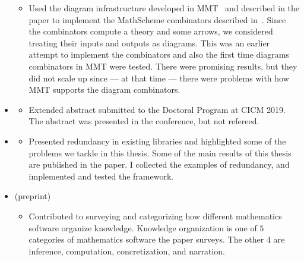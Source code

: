 \begin{itemize}
\begin{itemize}
    \item[] Used the diagram infrastructure developed in MMT~\cite{rabe2013scalable} and described in the paper to implement the MathScheme combinators described in~\cite{carette2018building}. Since the combinators compute a theory and some arrows, we considered treating their inputs and outputs as diagrams.
This was an earlier attempt to implement the combinators and also the first time diagrams combinators in MMT were tested.  There were promising results, but they did not scale up since --- at that time --- there were problems with how MMT supports the diagram combinators. 
    \end{itemize}        
    \item \cite{cicm2019docotral} 
    \begin{itemize}
    \item[] Extended abstract submitted to the Doctoral Program at CICM 2019. The abstract was presented in the conference, but not refereed. 
    \end{itemize}
    \item \cite{leverageCICM2020} 
    \begin{itemize}
    \item[]  Presented redundancy in existing libraries and highlighted some of the problems we tackle in this thesis. Some of the main results of this thesis are published in the paper. I collected the examples of redundancy, and implemented and tested the framework.
    \end{itemize} 
    \item \cite{bercic2020space} (preprint)
    \begin{itemize}
    \item[] Contributed to surveying and categorizing how different mathematics software organize knowledge. Knowledge organization is one of $5$ categories of mathematics software the paper surveys. The other $4$ are inference, computation, concretization, and narration. 
    \end{itemize}        
\end{itemize}

